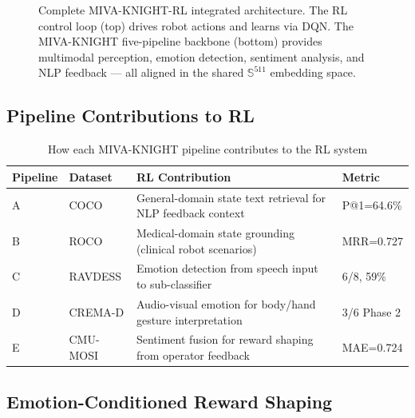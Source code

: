 \documentclass[12pt,a4paper]{article}
\theoremstyle{definition}
\theoremstyle{plain}
\theoremstyle{remark}
\newcommand{\Sph}{\mathbb{S}}
\begin{document}
\begin{figure}[H]
{
}
\caption{Complete MIVA-KNIGHT-RL integrated architecture. The RL control loop (top) drives robot actions and learns via DQN. The MIVA-KNIGHT five-pipeline backbone (bottom) provides multimodal perception, emotion detection, sentiment analysis, and NLP feedback — all aligned in the shared $\Sph^{511}$ embedding space.}
\label{fig:full_integration}
\end{figure}

\subsection{Pipeline Contributions to RL}

\begin{table}[H]
\centering
\caption{How each MIVA-KNIGHT pipeline contributes to the RL system}
\begin{tabularx}{\textwidth}{llXl}
\toprule
\textbf{Pipeline} & \textbf{Dataset} & \textbf{RL Contribution} & \textbf{Metric} \\
\midrule
A & COCO & General-domain state text retrieval for NLP feedback context & P@1=64.6\% \\
B & ROCO & Medical-domain state grounding (clinical robot scenarios) & MRR=0.727 \\
C & RAVDESS & Emotion detection from speech input to sub-classifier & 6/8, 59\% \\
D & CREMA-D & Audio-visual emotion for body/hand gesture interpretation & 3/6 Phase 2 \\
E & CMU-MOSI & Sentiment fusion for reward shaping from operator feedback & MAE=0.724 \\
\bottomrule
\end{tabularx}
\end{table}

\subsection{Emotion-Conditioned Reward Shaping}
\end{document}
